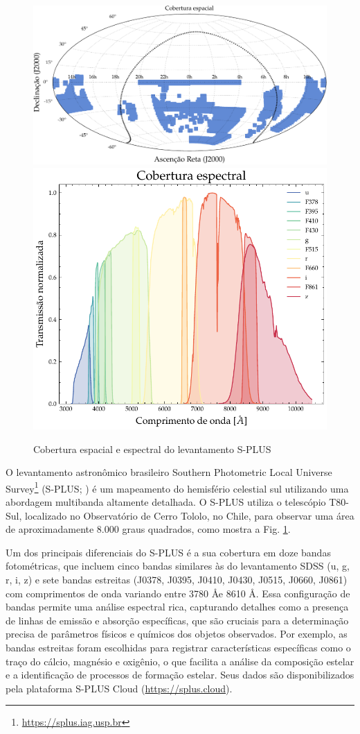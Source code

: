 \begin{figure}[!ht]
  \centering
  \caption{Cobertura espacial e espectral do levantamento S-PLUS}
  \label{fig:splus}
  \includegraphics[width=0.61\linewidth]{notebooks/plots/footprint_splus.pdf}\hfill
  \includegraphics[width=0.37\linewidth]{figures/transmission_splus.pdf}
\end{figure}

O levantamento astronômico brasileiro Southern Photometric Local Universe Survey\footnote{\url{https://splus.iag.usp.br}} (S-PLUS; \citealp{splus}) é um mapeamento do hemisfério celestial sul utilizando uma abordagem multibanda altamente detalhada. O S-PLUS utiliza o telescópio T80-Sul, localizado no Observatório de Cerro Tololo, no Chile, para observar uma área de aproximadamente 8.000 graus quadrados, como mostra a Fig. \ref{fig:splus}.

Um dos principais diferenciais do S-PLUS é a sua cobertura em doze bandas fotométricas, que incluem cinco bandas similares às do levantamento SDSS (u, g, r, i, z) e sete bandas estreitas (J0378, J0395, J0410, J0430, J0515, J0660, J0861) com comprimentos de onda variando entre 3780 \AA e 8610 \AA. Essa configuração de bandas permite uma análise espectral rica, capturando detalhes como a presença de linhas de emissão e absorção específicas, que são cruciais para a determinação precisa de parâmetros físicos e químicos dos objetos observados. Por exemplo, as bandas estreitas foram escolhidas para registrar características específicas como o traço do cálcio, magnésio e oxigênio, o que facilita a análise da composição estelar e a identificação de processos de formação estelar. Seus dados são disponibilizados pela plataforma S-PLUS Cloud (\url{https://splus.cloud}).







